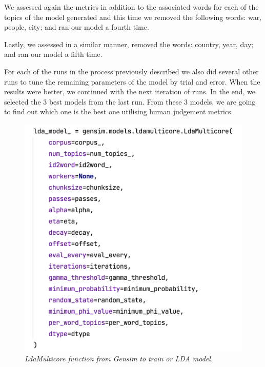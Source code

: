 \documentclass[twoside,12pt,a4paper]{article}
\begin{document}
We assessed again the metrics in addition to the associated words for each of the topics of the model generated and this time we removed the following words: war, people, city; and ran our model a fourth time.

Lastly, we assessed in a similar manner, removed the words: country, year, day; and ran our model a fifth time.

For each of the runs in the process previously described we also did several other runs to tune the remaining parameters of the model by trial and error. When the results were better, we continued with the next iteration of runs. In the end, we selected the 3 best models from the last run. From these 3 models, we are going to find out which one is the best one utilising human judgement metrics.\\

\begin{figure}[h]
\centering
\includegraphics[scale=0.45]{lda_multicore.png}
\caption{\textit{LdaMulticore function from Gensim to train or LDA model.}}
\label{fig:lda_multicore}
\end{figure}
\end{document}
